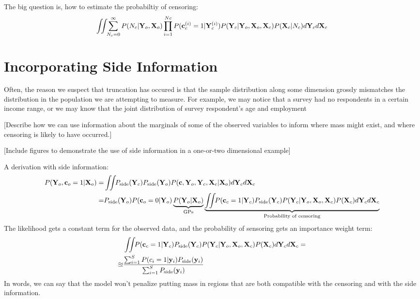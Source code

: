 \documentclass{article}
\begin{document}
The big question is, how to estimate the probabiltiy of censoring:
%
\begin{align}
\int \!\!\! \int \!\! \sum_{N_c = 0}^\infty P(N_c | \mathbf{Y}_o, \mathbf{X}_o ) \prod_{i=1}^{Nc} P( {\bf{c}}_c^{(i)} = 1 | \mathbf{Y}_c^{(i)} ) P( \mathbf{Y}_c | \mathbf{Y}_o, \mathbf{X}_o, \mathbf{X}_c) P(\mathbf{X}_c | N_c ) d\mathbf{Y}_c d\mathbf{X}_c
\label{eqn:approx-prob-censoring}
\end{align}

%

\section{Incorporating Side Information}

Often, the reason we suspect that truncation has occured is that the sample distribution along some dimension grossly mismatches the distribution in the population we are attempting to measure.  For example, we may notice that a survey had no respondents in a certain income range, or we may know that the joint distribution of survey respondent's age and employment

[Describe how we can use information about the marginals of some of the observed variables to inform where mass might exist, and where censoring is likely to have occurred.]

[Include figures to demonstrate the use of side information in a one-or-two dimensional example]

A derivation with side information:
%
\begin{align}
P(\vY_o, \vc_o = 1 | \vX_o) = & \intlatent P_{\textrm{side}}(\vY_c) P_{\textrm{side}}(\vY_o) P( \vc, \vY_o, \vY_c, \vX_c | \vX_o ) d\vY_c d\vX_c \\
= & P_{\textrm{side}}(\vY_o) P( \vc_o = 0 | \vY_o ) \underbrace{P( \vY_o | \vX_o )}_{\textrm{GPs}} \underbrace{\intlatent P( \vc_c = 1 | \vY_c ) P_{\textrm{side}}(\vY_c) P( \vY_c | \vY_o, \vX_o, \vX_c) P(\vX_c) d\vY_c d\vX_c }_{\textrm{Probability of censoring}}
\label{eqn:full_censoring_likelihood}
\end{align}
%
The likelihood gets a constant term for the observed data, and the probability of sensoring gets an importance weight term:
%
\begin{align}
& \int \!\!\! \int \!\! P( {\bf{c}}_c = 1 | \mathbf{Y}_c )  P_{\textrm{side}}(\mathbf{Y}_c) P( \mathbf{Y}_c | \mathbf{Y}_o, \mathbf{X}_o, \mathbf{X}_c) P(\mathbf{X}_c) d\mathbf{Y}_c d\mathbf{X}_c = \\
\approxeq & \frac{ \sum_{i=1}^S P(c_i = 1 | {\bf{y}}_i ) P_{\textrm{side}}({\bf{y}}_i) }{  \sum_{i=1}^S P_{\textrm{side}}({\bf{y}}_i)}
\label{eqn:approx-prob-censoring}
\end{align}
%
In words, we can say that the model won't penalize putting mass in regions that are both compatible with the censoring and with the side information.
\end{document}
